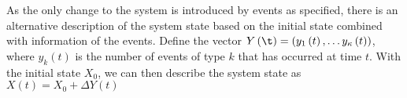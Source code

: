 \documentclass[10pt,a4paper]{article}
\begin{document}
As the only change to the system is introduced by events as specified, there is an alternative description of the system state based on the initial state combined with information of the events. Define the vector $Y\left( \t \right) = \left( y_1\left( t \right) , \ldots y_\kappa \left( t \right) \right)$, where $y_k \left( t \right)$ is the number of events of type $k$ that has occurred at time $t$. With the initial state $X_0$, we can then describe the system state as $X \left( t \right) = X_0 + \Delta Y \left( t \right)$

%
%
%
%
%
%
%
%
%
%
\end{document}
